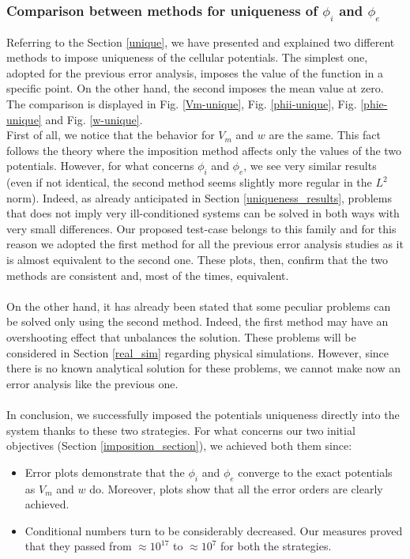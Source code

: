 \documentclass[a4paper,11pt]{article}
\begin{document}
\subsubsection{Comparison between methods for uniqueness of $\phi_i$ and $\phi_e$}
Referring to the Section \ref{unique}, we have presented and explained two different methods to impose uniqueness of the cellular potentials.
The simplest one, adopted for the previous error analysis, imposes the value of the function in a specific point. On the other hand, the second imposes the mean value at zero. The comparison is displayed in Fig. \ref{Vm-unique}, Fig. \ref{phii-unique}, Fig. \ref{phie-unique} and Fig. \ref{w-unique}.\\
\noindent First of all, we notice that the behavior for $V_m$ and $w$ are the same. This fact follows the theory where the imposition method affects only the values of the two potentials. However, for what concerns $\phi_i$ and $\phi_e$, we see very similar results (even if not identical, the second method seems slightly more regular in the $L^2$ norm). Indeed, as already anticipated in Section \ref{uniqueness_results}, problems that does not imply very ill-conditioned systems can be solved in both ways with very small differences. Our proposed test-case belongs to this family and for this reason we adopted the first method for all the previous error analysis studies as it is almost equivalent to the second one. These plots, then, confirm that the two methods are consistent and, most of the times, equivalent. \\ \\
On the other hand, it has already been stated that some peculiar problems can be solved only using the second method. Indeed, the first method may have an overshooting effect that unbalances the solution. These problems will be considered in Section \ref{real_sim} regarding physical simulations. However, since there is no known analytical solution for these problems, we cannot make now an error analysis like the previous one.\\ \\
\noindent In conclusion, we successfully imposed the potentials uniqueness directly into the system thanks to these two strategies. For what concerns our two initial objectives (Section \ref{imposition_section}), we achieved both them since:
\begin{itemize}
	\item Error plots demonstrate that the $\phi_i$ and $\phi_e$ converge to the exact potentials as $V_m$ and $w$ do. Moreover, plots show that all the error orders are clearly achieved.
	\item Conditional numbers turn to be considerably decreased. Our measures proved that they passed from $\approx 10^{17}$ to $\approx 10^{7}$ for both the strategies.
\end{itemize}
\newpage
\end{document}
